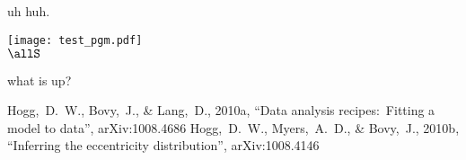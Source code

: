\documentclass[12pt,twoside,pdftex]{article}
\begin{document}
uh huh.

\clearpage

\noindent
\texttt{[image: test\_pgm.pdf]}\\
$\allS$

\begin{problem}
what is up?
\end{problem}

\clearpage
{}\theendnotes

\clearpage
\begin{thebibliography}{}\raggedright
{}
  Hogg,~D.~W., Bovy,~J., \& Lang,~D., 2010a,
  ``Data analysis recipes:\ Fitting a model to data'', arXiv:1008.4686
  Hogg,~D.~W., Myers,~A.~D., \& Bovy,~J., 2010b,
  ``Inferring the eccentricity distribution'', arXiv:1008.4146
\end{thebibliography}
\end{document}

